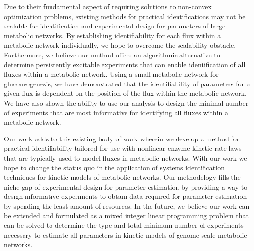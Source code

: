 \documentclass[10pt]{article}
\begin{document}
	Due to their fundamental aspect of requiring solutions to non-convex optimization problems, existing methods for practical identifications may not be scalable for identification and experimental design for parameters of large metabolic networks. By establishing identifiability for each flux within a metabolic network individually, we hope to overcome the scalability obstacle. Furthermore, we believe our method offers an algorithmic alternative to determine persistently excitable experiments that can enable identification of all fluxes within a metabolic network. Using a small metabolic network for gluconeogenesis, we have demonstrated that the identifiability of parameters for a given flux is dependent on the position of the flux within the metabolic network. We have also shown the ability to use our analysis to design the minimal number of experiments that are most informative for identifying all fluxes within a metabolic network.
	
	Our work adds to this existing body of work wherein we develop a method for practical identifiability tailored for use with nonlinear enzyme kinetic rate laws that are typically used to model fluxes in metabolic networks. With our work we hope to change the status quo in the application of systems identification techniques for kinetic models of metabolic networks. Our methodology fills the niche gap of experimental design for parameter estimation by providing a way to design informative experiments to obtain data required for parameter estimation by spending the least amount of resources.	
	In the future, we believe our work can be extended and formulated as a mixed integer linear programming problem that can be solved to determine the type and total minimum number of experiments necessary to estimate all parameters in kinetic models of genome-scale metabolic networks.
	
	
\end{document}
